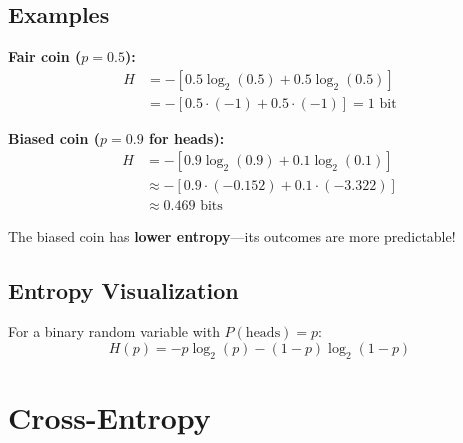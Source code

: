 \subsection{Examples}

\textbf{Fair coin ($p = 0.5$):}
\begin{align}
H &= -[0.5 \log_2(0.5) + 0.5 \log_2(0.5)] \\
&= -[0.5 \cdot (-1) + 0.5 \cdot (-1)] = 1 \text{ bit}
\end{align}

\textbf{Biased coin ($p = 0.9$ for heads):}
\begin{align}
H &= -[0.9 \log_2(0.9) + 0.1 \log_2(0.1)] \\
&\approx -[0.9 \cdot (-0.152) + 0.1 \cdot (-3.322)] \\
&\approx 0.469 \text{ bits}
\end{align}

\begin{important}
The biased coin has \textbf{lower entropy}---its outcomes are more predictable!
\end{important}

\subsection{Entropy Visualization}

For a binary random variable with $P(\text{heads}) = p$:
\[
H(p) = -p\log_2(p) - (1-p)\log_2(1-p)
\]

\begin{center}
\end{center}

\section{Cross-Entropy}


